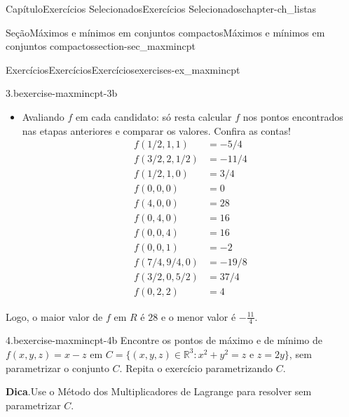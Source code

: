 \documentclass[oneside,10pt,]{book}
\newcommand{\blocktitlefont}{\relax}
\numberwithin{equation}{section}
\newcommand{\R}{\mathbb R}
\begin{document}
\begin{chapterptx}{Capítulo}{Exercícios Selecionados}{}{Exercícios Selecionados}{}{}{chapter-ch_listas}
\begin{sectionptx}{Seção}{Máximos e mínimos em conjuntos compactos}{}{Máximos e mínimos em conjuntos compactos}{}{}{section-sec_maxmincpt}
\begin{exercises-subsection-numberless}{Exercícios}{Exercícios}{}{Exercícios}{}{}{exercises-ex_maxmincpt}
\begin{divisionexercise}{3.b}{}{}{exercise-maxmincpt-3b}
\begin{itemize}[label=\textbullet]
\begin{equation*}
h_5(x) =
f(x,0,4-x) = 3x^2 -9x+16, x \in [0,4].
\end{equation*}
O único ponto crítico de \(h_5\) é \(x=\dfrac{3}{2} \in ]0,4[\). Os candidatos são \(x=0\), \(x= \dfrac{3}{2}\) e \(x=4\), que correspondem a \((0,0,4)\), \(\Big( \dfrac{3}{2},0,
\dfrac{5}{2}\Big)(4, 0, 0)\).%
\par
Finalmente, em \(A_6\), escrevemos \(z=4-y\) e%
\begin{equation*}
h_6(y) = f(0,y,4-y) = 3y^2 -12y+16, y \in [0,4].
\end{equation*}
O único ponto crítico de \(h_6\) é \(y=2\in ]0,4[\). Os candidatos são \(y=0\), \(y= 2\) e \(y=4\), que correspondem a \((0,0,4)\), \((0, 2,2)\) e \((0, 4, 0)\).%
\item{}Avaliando \(f\) em cada candidato: só resta calcular \(f\) nos pontos encontrados nas etapas anteriores e comparar os valores. Confira as contas!%
\begin{align*}
f( 1/2, 1, 1) &= -5/4\\
f( {3}/{2}, 2,{1}/{2}) &= -{11}/{4}\\
f( {1}/{2}, 1, 0) &= {3}/{4}\\
f\left( 0,0,0\right) &= 0\\
f\left(4, 0, 0\right) &= 28\\
f\left( 0,4,0\right) &= 16\\
f\left( 0,0,4 \right) &= 16\\
f\left( 0, 0, 1\right) &= -2\\
f\left( {7}/{4}, {9}/{4}, 0\right) &= -{19}/{8}\\
f\left( {3}/{2}, 0, {5}/{2}\right) &= {37}/{4}\\
f\left( 0, 2, 2\right) &= 4
\end{align*}
%
\end{itemize}
Logo, o maior valor de \(f\) em \(R\) é \(28\) e o menor valor é \(-\frac{11}{4}\).%
%
\end{divisionexercise}%
\begin{divisionexercise}{4.b}{}{}{exercise-maxmincpt-4b}%
Encontre os pontos de máximo e de mínimo de \(f(x,y,z) =
x-z\) em \(C = \big\{(x,y,z) \in \R^3\colon x^2 + y^2 =z
\text{ e } z=2y\big\}\), sem parametrizar o conjunto \(C\). Repita o exercício parametrizando \(C\).%
\par\smallskip%
\noindent\textbf{\blocktitlefont Dica}.\hypertarget{hint-maxmincpt-4b-b}{}\quad{}Use o Método dos Multiplicadores de Lagrange para resolver sem parametrizar \(C\).%
\par\smallskip%

\end{divisionexercise}
\end{exercises-subsection-numberless}
\end{sectionptx}
\end{chapterptx}
\end{document}
